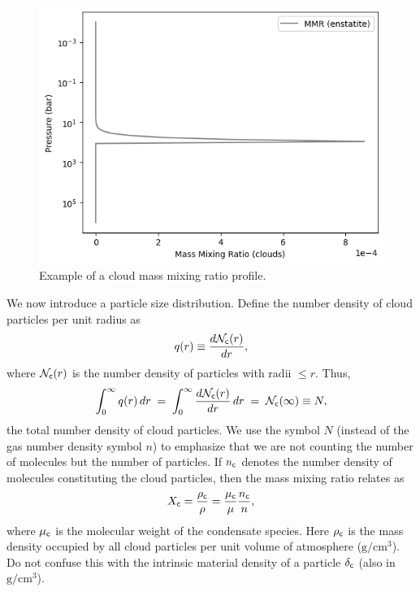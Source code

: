 \begin{figure}[htb]
\begin{center}
\includegraphics[width=\linewidth]{fig/clouds/mmrcloud.png}
\caption{Example of a cloud mass mixing ratio profile.\label{fig:vmrcloud}}
\end{center}
\end{figure}

We now introduce a particle size distribution.  
Define the number density of cloud particles per unit radius as
\begin{align}
    q(r) \equiv \frac{d \mathcal{N}_{\mathsf{c}} (r)}{d r},
\end{align}
where $\mathcal{N}_{\mathsf{c}}(r)$ is the number density of particles with radii $\le r$.  
Thus,
\begin{align}
    \int_0^\infty q(r)\, dr \;=\; \int_0^\infty \frac{d \mathcal{N}_{\mathsf{c}} (r)}{d r} \, dr \;=\; \mathcal{N}_{\mathsf{c}} (\infty) \equiv N,
\end{align}
the total number density of cloud particles.  
We use the symbol $N$ (instead of the gas number density symbol $n$) to emphasize that we are not counting the number of molecules but the number of particles.  
If $n_{\mathsf{c}}$ denotes the number density of molecules constituting the cloud particles, then the mass mixing ratio relates as
\begin{align}
    X_{\mathsf{c}} = \frac{\rho_{\mathsf{c}}}{\rho} = \frac{\mu_{\mathsf{c}}}{\mu} \frac{n_{\mathsf{c}}}{n},
\end{align}
where ${\mu_{\mathsf{c}}}$ is the molecular weight of the condensate species.  
Here $\rho_{\mathsf{c}}$ is the mass density occupied by all cloud particles per unit volume of atmosphere ($\mathrm{g/cm^3}$).  
Do not confuse this with the intrinsic material density of a particle $\delta_{\mathsf{c}}$ (also in $\mathrm{g/cm^3}$).

